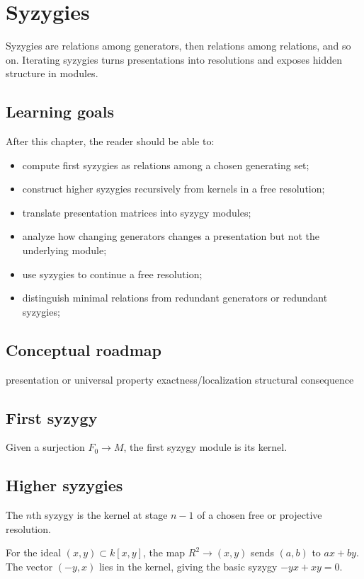 \chapter{Syzygies}
\label{ch:v24}

Syzygies are relations among generators, then relations among relations, and so on. Iterating syzygies turns presentations into resolutions and exposes hidden structure in modules.

\section*{Learning goals}
After this chapter, the reader should be able to:
\begin{itemize}
\item compute first syzygies as relations among a chosen generating set;
\item construct higher syzygies recursively from kernels in a free resolution;
\item translate presentation matrices into syzygy modules;
\item analyze how changing generators changes a presentation but not the underlying module;
\item use syzygies to continue a free resolution;
\item distinguish minimal relations from redundant generators or redundant syzygies;
\end{itemize}
\section*{Conceptual roadmap}
\volroadmap
  {presentation or universal property}
  {exactness/localization}
  {structural consequence}

\section{First syzygy}
Given a surjection $F_0\to M$, the first syzygy module is its kernel.

\section{Higher syzygies}
The $n$th syzygy is the kernel at stage $n-1$ of a chosen free or projective resolution.

\begin{example}\label{ex:v24-expand-01}
For the ideal $(x,y)\subset k[x,y]$, the map $R^2\to(x,y)$ sends $(a,b)$ to $ax+by$. The vector $(-y,x)$ lies in the kernel, giving the basic syzygy $-yx+xy=0$.
\end{example}

